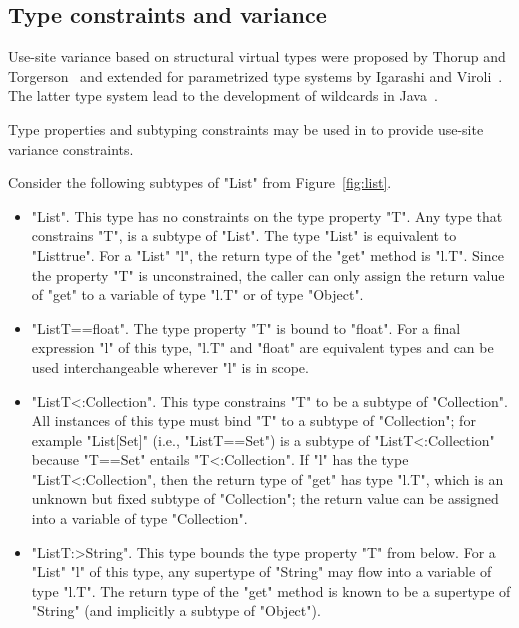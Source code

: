\subsection{Type constraints and variance}
\label{sec:variance}
Use-site variance based on structural virtual types were proposed by
Thorup and Torgerson~\cite{unifying-genericity} and extended for
parametrized type systems by Igarashi and
Viroli~\cite{variant-parametric-types}.  The latter type system lead
to the development of wildcards in
Java~\cite{Java3,adding-wildcards,wildcards-safe}.

Type properties and subtyping constraints may be used in \Xten{} to 
provide use-site variance
constraints.

Consider the following subtypes  of \xcd"List" from
Figure~\ref{fig:list}.
\begin{itemize}
\item \xcd"List".  This type has no constraints on the type
property \xcd"T".
Any type that constrains \xcd"T",
is a subtype of \xcd"List".  The type \xcd"List" is equivalent to
\xcd"List{true}".
%
For a \xcd"List" \xcd"l", the return type of the \xcd"get" method
is \xcd"l.T".
Since the property \xcd"T" is unconstrained,
the caller can only assign the return value of \xcd"get"
to a variable of type \xcd"l.T" or of type \xcd"Object".

\item \xcd"List{T==float}".
The type property \xcd"T" is bound to \xcd"float".
For a final expression \xcd"l" of this type,
\xcd"l.T" and \xcd"float" are equivalent types and can be used
interchangeable wherever \xcd"l" is in scope.

\item \xcd"List{T<:Collection}".
This type constrains \xcd"T" to be a subtype of \xcd"Collection".
All instances of this type must bind \xcd"T" to a subtype of
\xcd"Collection"; for example \xcd"List[Set]" (i.e.,
\xcd"List{T==Set}") is a subtype of
\xcd"List{T<:Collection}" because \xcd"T==Set" entails
\xcd"T<:Collection".
%
If \xcd"l" has the type \xcd"List{T<:Collection}",
then the return type of \xcd"get" has type \xcd"l.T", which is an unknown but
fixed subtype of \xcd"Collection"; the return value can be
assigned into a variable of type \xcd"Collection".

\item \xcd"List{T:>String}".  This type bounds the type property
\xcd"T"
from below.  For a \xcd"List" \xcd"l" of this type, any
supertype of \xcd"String" may flow into a variable of type \xcd"l.T".
The return type of the \xcd"get"
method is known to be a
supertype of \xcd"String" (and implicitly a subtype of \xcd"Object").
\end{itemize}

